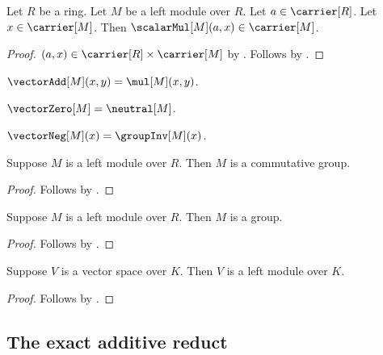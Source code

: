 \begin{proposition}\label{module_scalar_type}
    Let $R$ be a ring.
    Let $M$ be a left module over $R$.
    Let $a\in\carrier[R]$.
    Let $x\in\carrier[M]$.
    Then $\scalarMul[M](a,x)\in\carrier[M]$.
\end{proposition}
\begin{proof}
    $(a,x)\in\carrier[R]\times\carrier[M]$
        by .
    Follows by .
\end{proof}

\begin{abbreviation}\label{vector_addition}
    $\vectorAdd[M](x,y)=\mul[M](x,y)$.
\end{abbreviation}

\begin{abbreviation}\label{vector_zero}
    $\vectorZero[M]=\neutral[M]$.
\end{abbreviation}

\begin{abbreviation}\label{vector_negation}
    $\vectorNeg[M](x)=\groupInv[M](x)$.
\end{abbreviation}

\begin{corollary}\label{module_is_commutative_group}
    Suppose $M$ is a left module over $R$.
    Then $M$ is a commutative group.
\end{corollary}
\begin{proof}
    Follows by .
\end{proof}

\begin{corollary}\label{module_is_group}
    Suppose $M$ is a left module over $R$.
    Then $M$ is a group.
\end{corollary}
\begin{proof}
    Follows by
        .
\end{proof}

\begin{corollary}\label{vector_space_is_module}
    Suppose $V$ is a vector space over $K$.
    Then $V$ is a left module over $K$.
\end{corollary}
\begin{proof}
    Follows by .
\end{proof}

\subsection{The exact additive reduct}

